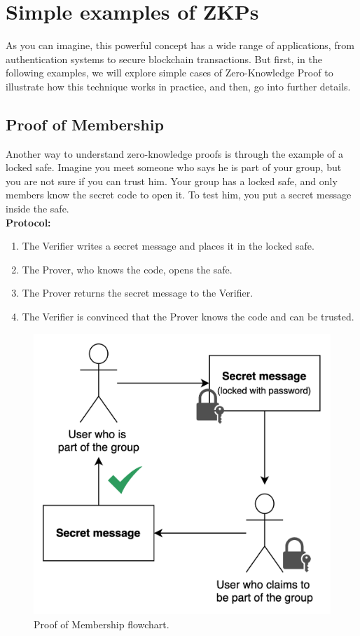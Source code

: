 \section{Simple examples of ZKPs}
\justify
As you can imagine, this powerful concept has a wide range of applications, from authentication systems to secure blockchain transactions. But first, in the following examples, we will explore simple cases of Zero-Knowledge Proof to illustrate how this technique works in practice, and then, go into further details.\cite{chainalysis2024}

\subsection{Proof of Membership}
Another way to understand zero-knowledge proofs is through the example of a locked safe. \cite{CirculariseZKPExamples} Imagine you meet someone who says he is part of your group, but you are not sure if you can trust him. Your group has a locked safe, and only members know the secret code to open it. To test him, you put a secret message inside the safe.
\\
\textbf{Protocol:}
\begin{enumerate}
\raggedright
    \item The Verifier writes a secret message and places it in the locked safe.
    \item The Prover, who knows the code, opens the safe.
    \item The Prover returns the secret message to the Verifier.
    \item The Verifier is convinced that the Prover knows the code and can be trusted.
\end{enumerate}

\begin{figure}[h!]
\centering
\includegraphics[scale=0.15]{Simple Examples/membership.png}
\caption{Proof of Membership flowchart.}
\end{figure}


